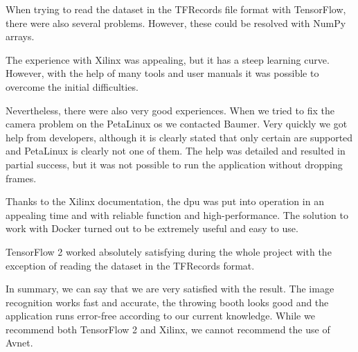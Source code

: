 When trying to read the dataset in the TFRecords file format with TensorFlow, there were also several problems.
However, these could be resolved with NumPy arrays.

The experience with Xilinx was appealing, but it has a steep learning curve.
However, with the help of many tools and user manuals it was possible to overcome the initial difficulties.

Nevertheless, there were also very good experiences.
When we tried to fix the camera problem on the PetaLinux \acrshort{os} we contacted Baumer.
Very quickly we got help from developers, although it is clearly stated that only certain  are supported and PetaLinux is clearly not one of them.
The help was detailed and resulted in partial success, but it was not possible to run the application without dropping frames.

Thanks to the Xilinx documentation, the \acrshort{dpu} was put into operation in an appealing time and with reliable function and high-performance.
The solution to work with Docker turned out to be extremely useful and easy to use.

TensorFlow 2 worked absolutely satisfying during the whole project with the exception of reading the dataset in the TFRecords format.

In summary, we can say that we are very satisfied with the result. 
The image recognition works fast and accurate, the throwing booth looks good and the application runs error-free according to our current knowledge.
While we recommend both TensorFlow 2 and Xilinx, we cannot recommend the use of Avnet.
